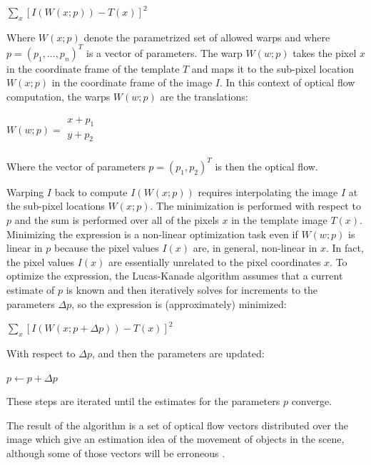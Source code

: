 \documentclass[msc, a4paper, classic, en]{ufbathesis}
\begin{document}
\begin{center}
  $\sum_{x}{[I(W(x;p))-T(x)]^2}$
\end{center}

Where $W(x;p)$ denote the parametrized set of allowed warps and where $p = (p_1,...,p_n)^T$ is a vector of parameters. The warp $W(w;p)$ takes the pixel $x$ in the coordinate frame of the template $T$ and maps it to the sub-pixel location $W(x;p)$ in the coordinate frame of the image $I$. In this context of optical flow computation, the warps $W(w;p)$ are the translations:

\begin{center}
$W(w;p) = \begin{matrix}
          x + p_1 \\
          y + p_2 \\
          \end{matrix}$
\end{center}

Where the vector of parameters $p = (p_1, p_2)^T$ is then the optical flow.

Warping $I$ back to compute $I(W(x;p))$ requires interpolating the image $I$ at the sub-pixel locations $W(x;p)$. The minimization is performed with respect to $p$ and the sum is performed over all of the pixels $x$ in the template image $T(x)$. Minimizing the expression is a non-linear optimization task even if $W(w;p)$ is linear in $p$ because the pixel values $I(x)$ are, in general, non-linear in $x$. In fact, the pixel values $I(x)$ are essentially unrelated to the pixel coordinates $x$. To optimize the expression, the Lucas-Kanade algorithm assumes that a current estimate of $p$ is known and then iteratively solves for increments to the parameters $\Delta{p}$, so the expression is (approximately) minimized:

\begin{center}
  $\sum_{x}{[I(W(x;p + \Delta{p}))-T(x)]^2}$
\end{center}

With respect to $\Delta{p}$, and then the parameters are updated:

\begin{center}
  $p \gets p + \Delta{p}$
\end{center}

These steps are iterated until the estimates for the parameters $p$ converge.

The result of the algorithm is a set of optical flow vectors distributed over the image which give an estimation idea of the movement of objects in the scene, although some of those vectors will be erroneous \cite{raul}.
\end{document}

